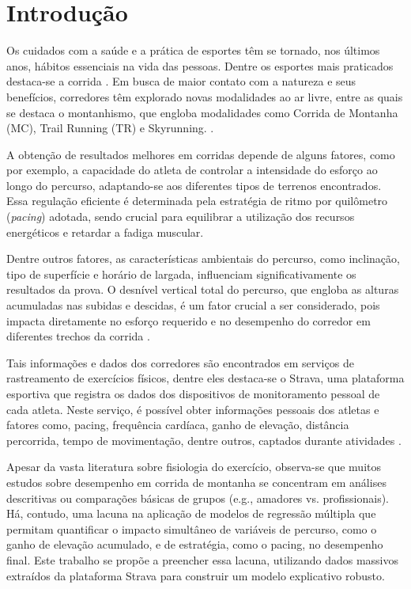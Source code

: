 
\chapter{Introdução}
Os cuidados com a saúde e a prática de esportes têm se tornado, nos últimos anos, hábitos essenciais na vida das pessoas. Dentre os esportes mais praticados destaca-se a corrida \cite{strava_pesquisa}. Em busca de maior contato com a natureza e seus benefícios, corredores têm explorado novas modalidades ao ar livre, entre as quais se destaca o montanhismo, que engloba modalidades como Corrida de Montanha (MC), Trail Running (TR) e Skyrunning. \cite{francagl}.

A obtenção de resultados melhores em corridas depende de alguns fatores, como por exemplo, a capacidade do atleta de controlar a intensidade do esforço ao longo do percurso, adaptando-se aos diferentes tipos de terrenos encontrados. Essa regulação eficiente é determinada pela estratégia de ritmo por quilômetro (\textit{pacing}) adotada, sendo crucial para equilibrar a utilização dos recursos energéticos e retardar a fadiga muscular.  \cite{borgesdl}

Dentre outros fatores, as características ambientais do percurso, como inclinação, tipo de superfície e horário de largada, influenciam significativamente os resultados da prova. O desnível vertical total do percurso, que engloba as alturas acumuladas nas subidas e descidas, é um fator crucial a ser considerado, pois impacta diretamente no esforço requerido e no desempenho do corredor em diferentes trechos da corrida \cite{borgesdl}.

Tais informações e dados dos corredores são encontrados em serviços de rastreamento de exercícios físicos, dentre eles destaca-se o Strava, uma plataforma esportiva que registra os dados dos dispositivos de monitoramento pessoal de cada atleta. Neste serviço, é possível obter informações pessoais dos atletas e fatores como, pacing, frequência cardíaca, ganho de elevação, distância percorrida, tempo de movimentação, dentre outros, captados durante atividades \cite{strava_info}. 

Apesar da vasta literatura sobre fisiologia do exercício, observa-se que muitos estudos sobre desempenho em corrida de montanha se concentram em análises descritivas ou comparações básicas de grupos (e.g., amadores vs. profissionais). Há, contudo, uma lacuna na aplicação de modelos de regressão múltipla que permitam quantificar o impacto simultâneo de variáveis de percurso, como o ganho de elevação acumulado, e de estratégia, como o pacing, no desempenho final. Este trabalho se propõe a preencher essa lacuna, utilizando dados massivos extraídos da plataforma Strava para construir um modelo explicativo robusto.

